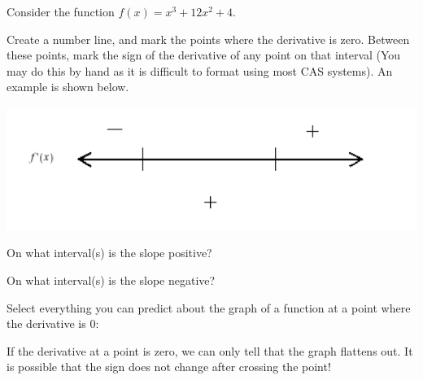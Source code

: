 \documentclass{ximera}
\begin{document}
\begin{question}
Consider the function $f(x)=x^3+12x^2+4$.

Create a number line, and mark the points where the derivative is zero. Between these points, mark the sign of the derivative of any point on that interval (You may do this by hand as it is difficult to format using most CAS systems). An example is shown below.

\begin{image}
\includegraphics{ExampleNumberline}
\end{image}

On what interval(s) is the slope positive?

\begin{selectAll}
\choice{$[-8, 0)$}
\choice{$(-\infty, 0]$}
\end{selectAll}

On what interval(s) is the slope negative?

\begin{selectAll}
\choice{$[-4, \infty)$}
\choice{$(-\infty, 0]$}
\end{selectAll}

Select everything you can predict about the graph of a function at a point where the derivative is 0:

\begin{selectAll}
\end{selectAll}
\begin{feedback}[correct]
If the derivative at a point is zero, we can only tell that the graph flattens out. It is possible that the sign does not change after crossing the point!
\end{feedback}
\end{question}
\end{document}
